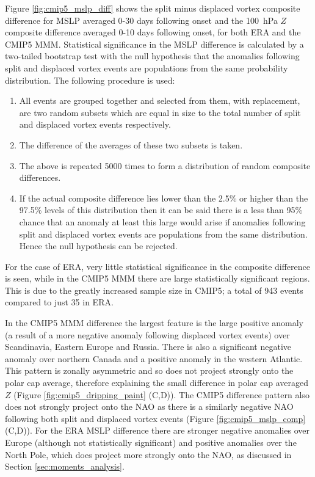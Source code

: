 \bigskip Figure \ref{fig:cmip5_mslp_diff} shows the split minus displaced vortex
composite difference for MSLP averaged 0-30 days following onset and the 100~hPa
$Z$ composite difference averaged 0-10 days following onset, for both ERA and
the CMIP5 MMM. Statistical significance in the MSLP difference is calculated by
a two-tailed bootstrap test with the null hypothesis that the anomalies
following split and displaced vortex events are populations from the same
probability distribution. The following procedure is used:
\begin{enumerate}
\item All events are grouped together and selected from them, with replacement,
  are two random subsets which are equal in size to the total number of split
  and displaced vortex events respectively.
\item The difference of the averages of these two subsets is taken.
\item The above is repeated 5000 times to form a distribution of random
  composite differences.
\item If the actual composite difference lies lower than the 2.5\% or higher
  than the 97.5\% levels of this distribution then it can be said there is a
  less than 95\% chance that an anomaly at least this large would arise if
  anomalies following split and displaced vortex events are populations from the
  same distribution. Hence the null hypothesis can be rejected.
\end{enumerate}
For the case of ERA, very little statistical significance in the
composite difference is seen, while in the CMIP5 MMM there are large
statistically significant regions. This is due to the greatly increased sample
size in CMIP5; a total of 943 events compared to just 35 in ERA. 

In the CMIP5 MMM difference the largest feature is the large positive anomaly (a
result of a more negative anomaly following displaced vortex events) over
Scandinavia, Eastern Europe and Russia. There is also a significant negative
anomaly over northern Canada and a positive anomaly in the western
Atlantic. This pattern is zonally asymmetric and so does not project strongly
onto the polar cap average, therefore explaining the small difference in polar
cap averaged $Z$ (Figure \ref{fig:cmip5_dripping_paint} (C,D)). The CMIP5
difference pattern also does not strongly project onto the NAO as there is a
similarly negative NAO following both split and displaced vortex events (Figure
\ref{fig:cmip5_mslp_comp} (C,D)). For the ERA MSLP difference there are stronger
negative anomalies over Europe (although not statistically significant) and
positive anomalies over the North Pole, which does project more strongly onto
the NAO, as discussed in Section \ref{sec:moments_analysis}. 

